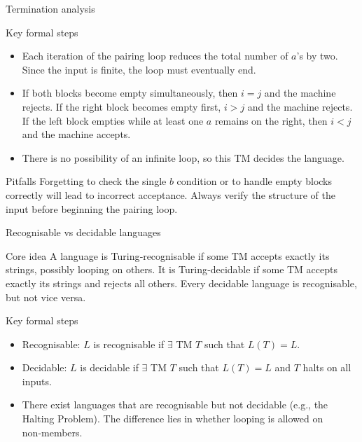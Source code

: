 \begin{frame}[t]{Termination analysis}
  \begin{tblock}{Key formal steps}
    \begin{itemize}
      \item Each iteration of the pairing loop reduces the total number
        of $a$’s by two.  Since the input is finite, the loop must
        eventually end.
      \item If both blocks become empty simultaneously, then $i=j$ and
        the machine rejects.  If the right block becomes empty first,
        $i>j$ and the machine rejects.  If the left block empties while
        at least one $a$ remains on the right, then $i<j$ and the
        machine accepts.
      \item There is no possibility of an infinite loop, so this TM
        decides the language.
    \end{itemize}
  \end{tblock}
  \begin{talert}{Pitfalls}
    Forgetting to check the single $b$ condition or to handle empty
    blocks correctly will lead to incorrect acceptance.  Always verify
    the structure of the input before beginning the pairing loop.
  \end{talert}
  \label{fr:7.2-09}
\end{frame}

\begin{frame}[t]{Recognisable vs decidable languages}
  \begin{tblock}{Core idea}
    A language is Turing‑recognisable if some TM accepts exactly its
    strings, possibly looping on others.  It is Turing‑decidable if
    some TM accepts exactly its strings and rejects all others.  Every
    decidable language is recognisable, but not vice versa.
  \end{tblock}
  \begin{tblock}{Key formal steps}
    \begin{itemize}
      \item Recognisable: $L$ is recognisable if $\exists$ TM $T$ such
        that $L(T)=L$.
      \item Decidable: $L$ is decidable if $\exists$ TM $T$ such that
        $L(T)=L$ and $T$ halts on all inputs.
      \item There exist languages that are recognisable but not
        decidable (e.g., the Halting Problem).  The difference lies in
        whether looping is allowed on non‑members.
    \end{itemize}
  \end{tblock}
  \label{fr:7.2-10}
\end{frame}

